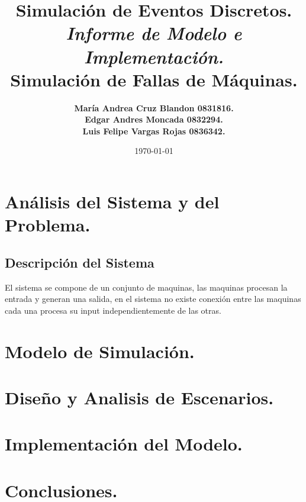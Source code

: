 \documentclass[10pt]{article}
\title{Simulación de Eventos Discretos.\\ \emph{Informe de Modelo e Implementación.} \\ \textbf{Simulación de Fallas de Máquinas.} }
\author{\textbf{María Andrea Cruz Blandon  0831816.} \\ \textbf{Edgar Andres Moncada 0832294.  }\\ \textbf{Luis Felipe Vargas Rojas 0836342. }}
\date{\today}
\begin{document}
\maketitle

\section{Análisis del Sistema y del Problema.}
\subsection{Descripción del Sistema}
El sistema se compone de un conjunto de maquinas, las maquinas procesan la entrada y generan una salida, en el  sistema no existe conexión entre las maquinas cada una procesa su input independientemente de las otras.



\section{Modelo de Simulación.}

\section{Diseño y Analisis de Escenarios.} 

\section{Implementación del Modelo.}

\section{Conclusiones.}
\end{document}
